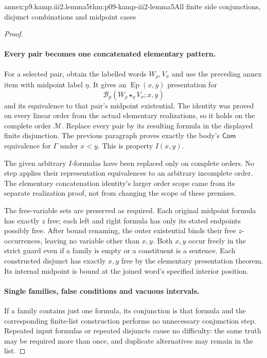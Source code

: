 \begin{annexitem}{annex:p9.kamp.iii2.lemma5}{thm:p09-kamp-iii2-lemma5}{All finite side conjunctions, disjunct combinations and midpoint cases}
\begin{proof}
\paragraph{Every pair becomes one concatenated elementary pattern.}
For a selected pair, obtain the labelled words
\(W_\rho,V_\sigma\) and use the preceding annex item with midpoint
label \(\eta\). It gives an
\(\operatorname{Ep}(x,y)\) presentation for
\[
             \mathcal B_p(W_\rho\mathbin{\star_\eta}V_\sigma;x,y)
\]
and its equivalence to that pair's midpoint existential. The identity
was proved on every linear order from the actual elementary
realizations, so it holds on the complete order \(\mathcal M\).
Replace every pair by its resulting formula in the displayed finite
disjunction. The previous paragraph proves exactly the body's
\(\mathsf{Com}\) equivalence for \(\Gamma\) under \(x<y\).
This is property \(I(x,y)\).

The given arbitrary \(I\)-formulas have been replaced only on complete
orders. No step applies their representation equivalences to an
arbitrary incomplete order. The elementary concatenation identity's
larger order scope came from its separate realization proof, not from
changing the scope of these premises.

The free-variable sets are preserved as required. Each original
midpoint formula has exactly \(z\) free; each left and right formula
has only its stated endpoints possibly free. After bound renaming,
the outer existential binds their free \(z\)-occurrences, leaving
no variable other than \(x,y\). Both \(x,y\) occur freely in the
strict guard even if a family is empty or a constituent is a sentence.
Each constructed disjunct has exactly \(x,y\) free by the elementary
presentation theorem. Its internal midpoint is bound at the joined
word's specified interior position.

\paragraph{Single families, false conditions and vacuous intervals.}
If a family contains just one formula, its conjunction is that formula
and the corresponding finite-list construction performs no unnecessary
conjunction step. Repeated input formulas or repeated disjuncts cause
no difficulty: the same truth may be required more than once, and
duplicate alternatives may remain in the list.


\end{proof}
\end{annexitem}
